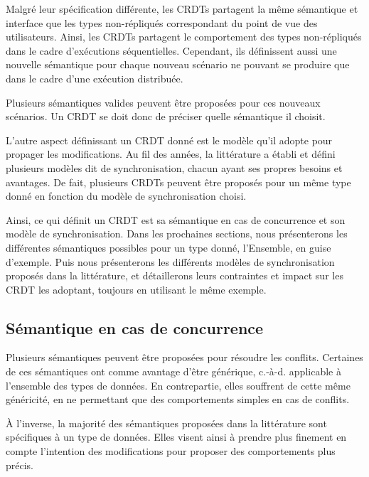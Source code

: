 \documentclass[12pt]{thesul}
\newcommand{\ie}{c.-à-d. }
\begin{document}
Malgré leur spécification différente, les \acp{CRDT} partagent la même sémantique et interface que les types non-répliqués correspondant du point de vue des utilisateurs.
Ainsi, les \acp{CRDT} partagent le comportement des types non-répliqués dans le cadre d'exécutions séquentielles.
Cependant, ils définissent aussi une nouvelle sémantique pour chaque nouveau scénario ne pouvant se produire que dans le cadre d'une exécution distribuée.

Plusieurs sémantiques valides peuvent être proposées pour ces nouveaux scénarios.
Un \ac{CRDT} se doit donc de préciser quelle sémantique il choisit.

L'autre aspect définissant un \ac{CRDT} donné est le modèle qu'il adopte pour propager les modifications.
Au fil des années, la littérature a établi et défini plusieurs modèles dit de synchronisation, chacun ayant ses propres besoins et avantages.
De fait, plusieurs \acp{CRDT} peuvent être proposés pour un même type donné en fonction du modèle de synchronisation choisi.

Ainsi, ce qui définit un \ac{CRDT} est sa sémantique en cas de concurrence et son modèle de synchronisation.
Dans les prochaines sections, nous présenterons les différentes sémantiques possibles pour un type donné, l'Ensemble, en guise d'exemple.
Puis nous présenterons les différents modèles de synchronisation proposés dans la littérature, et détaillerons leurs contraintes et impact sur les \ac{CRDT} les adoptant, toujours en utilisant le même exemple.


\subsection{Sémantique en cas de concurrence}

Plusieurs sémantiques peuvent être proposées pour résoudre les conflits.
Certaines de ces sémantiques ont comme avantage d'être générique, \ie applicable à l'ensemble des types de données.
En contrepartie, elles souffrent de cette même généricité, en ne permettant que des comportements simples en cas de conflits.

À l'inverse, la majorité des sémantiques proposées dans la littérature sont spécifiques à un type de données.
Elles visent ainsi à prendre plus finement en compte l'intention des modifications pour proposer des comportements plus précis.
\end{document}
